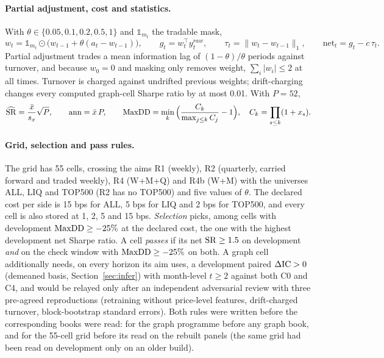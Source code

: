 \paragraph{Partial adjustment, cost and statistics.}
With $\theta\in\{0.05,0.1,0.2,0.5,1\}$ and $\mathbb 1_{m_t}$ the tradable mask,
\begin{equation}\label{eq:partial}
w_t=\mathbb 1_{m_t}\odot\big(w_{t-1}+\theta(a_t-w_{t-1})\big),\qquad g_t=w_t^\top y^{raw}_t,\qquad \tau_t=\|w_t-w_{t-1}\|_1,\qquad \mathrm{net}_t=g_t-c\,\tau_t .
\end{equation}
Partial adjustment trades a mean information lag of $(1-\theta)/\theta$ periods against turnover, and because $w_0=0$ and masking only removes weight, $\sum_i|w_i|\le2$ at all times. Turnover is charged against undrifted previous weights; drift-charging changes every computed graph-cell Sharpe ratio by at most 0.01. With $P=52$,
\begin{equation}\label{eq:sr}
\widehat{\mathrm{SR}}=\frac{\bar x}{s_x}\sqrt{P},\qquad \mathrm{ann}=\bar x\,P,\qquad \mathrm{MaxDD}=\min_k\Big(\frac{C_k}{\max_{j\le k}C_j}-1\Big),\quad C_k=\prod_{s\le k}(1+x_s).
\end{equation}

\paragraph{Grid, selection and pass rules.}
The grid has 55 cells, crossing the aims R1 (weekly), R2 (quarterly, carried forward and traded weekly), R4 (W+M+Q) and R4b (W+M) with the universes ALL, LIQ and TOP500 (R2 has no TOP500) and five values of $\theta$. The declared cost per side is 15 bps for ALL, 5 bps for LIQ and 2 bps for TOP500, and every cell is also stored at 1, 2, 5 and 15 bps. \emph{Selection} picks, among cells with development $\mathrm{MaxDD}\ge-25\%$ at the declared cost, the one with the highest development net Sharpe ratio. A cell \emph{passes} if its net $\mathrm{SR}\ge1.5$ on development \emph{and} on the check window with $\mathrm{MaxDD}\ge-25\%$ on both. A graph cell additionally needs, on every horizon its aim uses, a development paired $\Delta\mathrm{IC}>0$ (demeaned basis, Section~\ref{sec:infer}) with month-level $t\ge2$ against both C0 and C4, and would be relayed only after an independent adversarial review with three pre-agreed reproductions (retraining without price-level features, drift-charged turnover, block-bootstrap standard errors). Both rules were written before the corresponding books were read: for the graph programme before any graph book, and for the 55-cell grid before its read on the rebuilt panels (the same grid had been read on development only on an older build).
